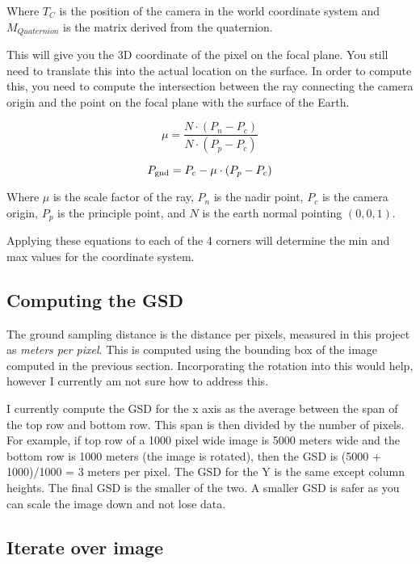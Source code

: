 Where $T_{C}$ is the position of the camera in the world coordinate system and
$M_{Quaternion}$ is the matrix derived from the quaternion. 

This will give you the 3D coordinate of the pixel on the focal plane.  You still need
to translate this into the actual location on the surface.  In order to compute this, you
need to compute the intersection between the ray connecting the camera origin and the 
point on the focal plane with the surface of the Earth.

\begin{equation}
\mu = \frac{N \cdot \left(P_n - P_c\right) }{N \cdot \left(P_p - P_c\right)}
\end{equation}

\begin{equation}
P_{\textup{gnd}} = P_c - \mu \cdot \left( P_{p} - P_{c} \right)
\end{equation}

Where $\mu$ is the scale factor of the ray, $P_n$ is the nadir point, $P_c$ is the camera origin, 
$P_p$ is the principle point, and $N$ is the earth normal pointing $\left( 0, 0, 1\right)$.
 
 
Applying these equations to each of the 4 corners will determine the min and max values for the 
coordinate system. 

\subsection*{Computing the GSD}

The ground sampling distance is the distance per pixels, measured in this project as \emph{meters per pixel}.
This is computed using the bounding box of the image computed in the previous section.  Incorporating the 
rotation into this would help, however I currently am not sure how to address this. 

I currently compute the GSD for the x axis as the average between the span of the top row and bottom row. 
This span is then divided by the number of pixels.  For example, if top row of a 1000 pixel wide image is 5000 meters wide and the bottom
row is 1000 meters (the image is rotated), then the GSD is (5000 + 1000)/1000 = 3 meters per pixel.  The 
GSD for the Y is the same except column heights. The final GSD is the smaller of the two.  A smaller GSD is safer as you can 
scale the image down and not lose data. 

 
\subsection*{Iterate over image}

